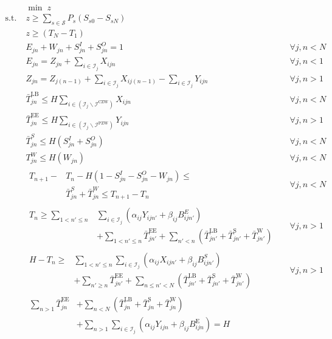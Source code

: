 \begin{align}
&\min \; z &&\\
\text{s.t.}\; &z \ge \sum_{s\in \mathcal{S}} P_s (S_{s0} - S_{sN}) && \\
		  & z \ge (T_N - T_1)  &&\\
		  & E_{jn} + W_{jn} + S_{jn}^I + S_{jn}^O = 1 && \forall j , n < N \\
		  & E_{jn} = Z_{jn} + \sum_{i \in \mathcal{I}_j} X_{ijn} && \forall j, n < 1 \\
		  & Z_{jn} = Z_{j(n-1)} + \sum_{i \in \mathcal{I}_j} X_{ij(n-1)} - \sum_{i \in \mathcal{I}_j} Y_{ijn} && \forall j, n > 1 \\
		  & \bar{T}_{jn}^{\text{LB}} \le H \sum_{i \in (\mathcal{I}_j \backslash \mathcal{I}^\text{CZW})} X_{ijn} &&\forall j, n < N \\ 
		  & \bar{T}_{jn}^{\text{EE}} \le H \sum_{i \in (\mathcal{I}_j \backslash \mathcal{I}^\text{PZW})} Y_{ijn} &&\forall j, n > 1 \\
		  & \bar{T}_{jn}^S \le H ( S_{jn}^I + S_{jn}^O ) && \forall j, n < N \\
		  & T_{jn}^W \le H (W_{jn}) && \forall j, n < N \\
&\begin{aligned}
T_{n+1} - & T_n - H (1 - S_{jn}^I - S_{jn}^O - W_{jn}) \le \\  &\bar{T}_{jn}^S + \bar{T}_{jn}^W \le T_{n+1} - T_n  
\end{aligned}&&\forall j, n < N \\
&\begin{aligned}
T_n \ge \sum_{1 < n' \le n} &\sum_{i \in \mathcal{I}_j} (\alpha_{ij} Y_{ijn'} + \beta_{ij} B_{ijn'}^E) \\ &+ \sum_{1 < n' \le n} \bar{T}_{jn'}^{\text{EE}} + \sum_{n' < n} (\bar{T}_{jn'}^{\text{LB}} + \bar{T}_{jn'}^{\text{S}} + \bar{T}_{jn'}^{\text{W}})
\end{aligned} && \forall j, n > 1 \\
&\begin{aligned}
H - T_n \ge &\sum_{1 < n' \le n} \sum_{i \in \mathcal{I}_j} (\alpha_{ij} X_{ijn'} + \beta_{ij} B_{ijn'}^S) \\ &+ \sum_{n' \ge n} \bar{T}_{jn'}^{\text{EE}} + \sum_{n \le n' < N} (\bar{T}_{jn'}^{\text{LB}} + \bar{T}_{jn'}^{\text{S}} + \bar{T}_{jn'}^{\text{W}})
\end{aligned}  && \forall j, n > 1 \\
&\begin{aligned}
\sum_{n > 1} \bar{T}_{jn}^{\text{EE}} &+ \sum_{n<N}(\bar{T}_{jn}^\text{LB} + \bar{T}_{jn}^{\text{S}} + \bar{T}_{jn}^\text{W}) \\ &+\sum_{n>1} \sum_{i \in \mathcal{I}_j} (\alpha_{ij} Y _{ijn} + \beta_{ij} B_{ijn}^\text{E}) = H

\end{aligned}
\end{align}
